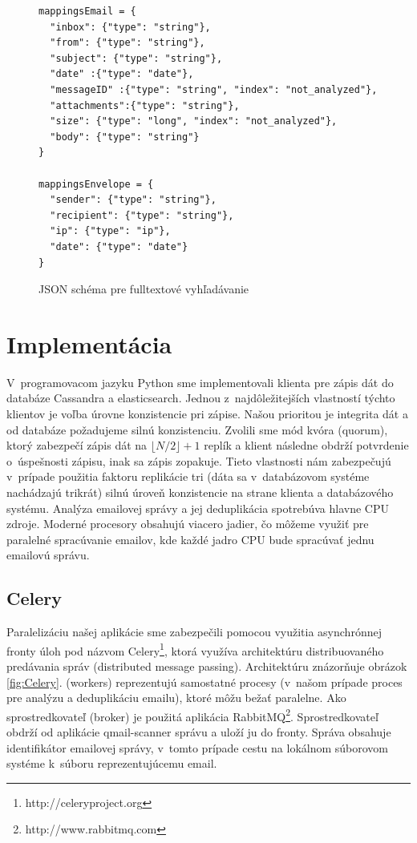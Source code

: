 \documentclass[11pt,twoside,a4paper]{book}
\begin{document}
\begin{figure}[h]
\begin{verbatim}
mappingsEmail = {
  "inbox": {"type": "string"},
  "from": {"type": "string"},
  "subject": {"type": "string"},
  "date" :{"type": "date"},
  "messageID" :{"type": "string", "index": "not_analyzed"},
  "attachments":{"type": "string"},
  "size": {"type": "long", "index": "not_analyzed"},
  "body": {"type": "string"}
}   
            
mappingsEnvelope = {
  "sender": {"type": "string"},
  "recipient": {"type": "string"},
  "ip": {"type": "ip"},
  "date": {"type": "date"}
}     
\end{verbatim}
 \caption{JSON schéma pre fulltextové vyhľadávanie}
 \label{fig:ESschema}
\end{figure}      

\newpage

\section{Implementácia}

V~programovacom jazyku Python sme implementovali klienta pre zápis dát do databáze Cassandra a elasticsearch. Jednou z~najdôležitejších vlastností týchto klientov je voľba úrovne konzistencie pri zápise. Našou prioritou je integrita dát a od databáze požadujeme silnú konzistenciu. Zvolili sme mód kvóra (quorum), ktorý zabezpečí zápis dát na $\lfloor N/2 \rfloor + 1$ replík a klient následne obdrží potvrdenie o~úspešnosti zápisu, inak sa zápis zopakuje. Tieto vlastnosti nám zabezpečujú v~prípade použitia faktoru replikácie tri (dáta sa v~databázovom systéme nachádzajú trikrát) silnú úroveň konzistencie na strane klienta a databázového systému. Analýza emailovej správy a jej deduplikácia spotrebúva hlavne CPU zdroje. Moderné procesory obsahujú viacero jadier, čo môžeme využiť pre paralelné spracúvanie emailov, kde každé jadro CPU bude spracúvať jednu emailovú správu.

\subsection*{Celery}
Paralelizáciu našej aplikácie sme zabezpečili pomocou využitia asynchrónnej fronty úloh pod názvom Celery\footnote{http://celeryproject.org}, ktorá využíva architektúru distribuovaného predávania správ (distributed message passing). Architektúru znázorňuje obrázok \ref{fig:Celery}.  (workers) reprezentujú samostatné procesy (v~našom prípade proces pre analýzu a deduplikáciu emailu), ktoré môžu bežať paralelne. Ako sprostredkovateľ (broker) je použitá aplikácia RabbitMQ\footnote{http://www.rabbitmq.com}. Sprostredkovateľ obdrží od aplikácie qmail-scanner správu a uloží ju do fronty. Správa obsahuje identifikátor emailovej správy, v~tomto prípade cestu na lokálnom súborovom systéme k~súboru reprezentujúcemu email.
\end{document}
